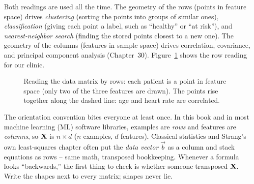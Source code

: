 Both readings are used all the time. The geometry of the rows (points in feature space)
drives \emph{clustering} (sorting the points into groups of similar ones),
\emph{classification} (giving each point a label, such as ``healthy'' or ``at risk''), and
\emph{nearest-neighbor search} (finding the stored points closest to a new one). The
geometry of the columns (features in sample space) drives correlation, covariance, and
principal component analysis (Chapter~30). Figure~\ref{ch34:fig-datacloud} shows the row
reading for our clinic.

\begin{figure}[htbp]
\centering
{}
\caption{Reading the data matrix by rows: each patient is a point in feature space (only
two of the three features are drawn). The points rise together along the dashed line: age
and heart rate are correlated.}
\label{ch34:fig-datacloud}
\end{figure}

\begin{trapbox}
The orientation convention bites everyone at least once. In this book and in most machine
learning (ML) software libraries, examples are \emph{rows} and features are \emph{columns}, so $\mathbf{X}$ is
$n \times d$ ($n$ examples, $d$ features). Classical statistics and Strang's own
least-squares chapter often put the \emph{data vector} $\vec{b}$ as a column and stack
equations as rows -- same math, transposed bookkeeping. Whenever a formula looks
``backwards,'' the first thing to check is whether someone transposed $\mathbf{X}$. Write
the shapes next to every matrix; shapes never lie.
\end{trapbox}

